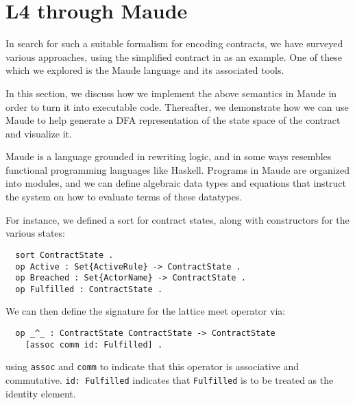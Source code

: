 \documentclass{article}
\begin{document}
\section{L4 through Maude}

In search for such a suitable formalism for encoding contracts,
we have surveyed various approaches, using the simplified contract in
\cite[Fig 1.]{contract_as_automaton} as an example.
One of these which we explored is the Maude language and its associated tools.

In this section, we discuss how we implement the above semantics in Maude in
order to turn it into executable code.
Thereafter, we demonstrate how we can use Maude to help generate a DFA
representation of the state space of the contract and visualize it.



Maude is a language grounded in rewriting logic, and in some ways resembles
functional programming languages like Haskell.
Programs in Maude are organized into modules, and we can define algebraic data
types and equations that instruct the system on how to evaluate terms of these
datatypes.

For instance, we defined a sort for contract states, along with constructors
for the various states:
\begin{lstlisting}
  sort ContractState .
  op Active : Set{ActiveRule} -> ContractState .
  op Breached : Set{ActorName} -> ContractState .
  op Fulfilled : ContractState .
\end{lstlisting}

We can then define the signature for the lattice meet operator via:

\begin{lstlisting}
  op _^_ : ContractState ContractState -> ContractState
    [assoc comm id: Fulfilled] .
\end{lstlisting}

using \texttt{assoc} and \texttt{comm} to indicate that this operator is
associative and commutative.
\texttt{id: Fulfilled} indicates that \texttt{Fulfilled}
is to be treated as the identity element.
\end{document}
